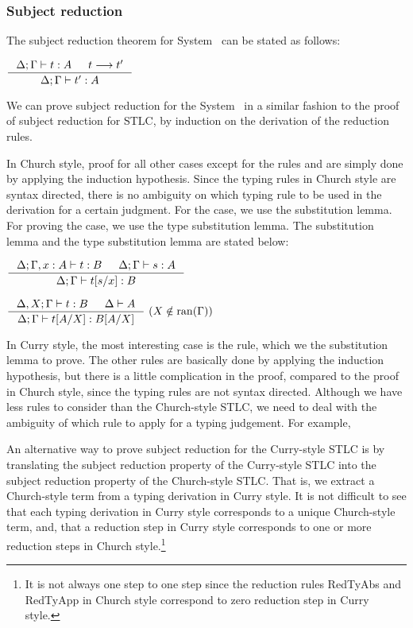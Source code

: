 \subsubsection*{Subject reduction}
The subject reduction theorem for System \F\ can be stated as follows:
\begin{theorem}
$\inference{\Delta;\Gamma |- t : A  & t --> t'}{\Delta;\Gamma |- t' : A}$
\end{theorem}
We can prove subject reduction for the System \F\, in a similar fashion
to the proof of subject reduction for STLC,
by induction on the derivation of the reduction rules.

In Church style, proof for all other cases except for the rules
 and  are simply done by applying
the induction hypothesis. Since the typing rules in Church style are
syntax directed, there is no ambiguity on which typing rule to be used
in the derivation for a certain judgment. For the  case,
we use the substitution lemma. For proving the  case,
we use the type substitution lemma. The substitution lemma and
the type substitution lemma are stated below:
\begin{lemma}[substitution]
$ \inference{\Delta;\Gamma,x:A |- t : B  & \Delta;\Gamma |- s : A}
	{\Delta;\Gamma |- t[s/x] : B} $
\end{lemma}
\begin{lemma}
$ \inference{\Delta,X;\Gamma |- t : B  & \Delta |- A}
	{\Delta;\Gamma |- t[A/X] : B[A/X]} ~ (X\notin\ran(\Gamma))$
\end{lemma}

In Curry style, the most interesting case is the  rule,
which we the substitution lemma to prove. The other rules are basically
done by applying the induction hypothesis, but there is a little complication
in the proof, compared to the proof in Church style, since the typing rules
are not syntax directed. Although we have less rules to consider than
the Church-style STLC, we need to deal with the ambiguity of which rule
to apply for a typing judgement. For example,

An alternative way to prove subject reduction for the Curry-style STLC is
by translating the subject reduction property of the Curry-style STLC into
the subject reduction property of the Church-style STLC. That is, we extract
a Church-style term from a typing derivation in Curry style. It is not
difficult to see that each typing derivation in Curry style corresponds to
a unique Church-style term, and, that a reduction step in Curry style
corresponds to one or more reduction steps in Church style.\footnote{
It is not always one step to one step since the reduction rules
{\sc RedTyAbs} and {\sc RedTyApp} in Church style correspond to
zero reduction step in Curry style.}

